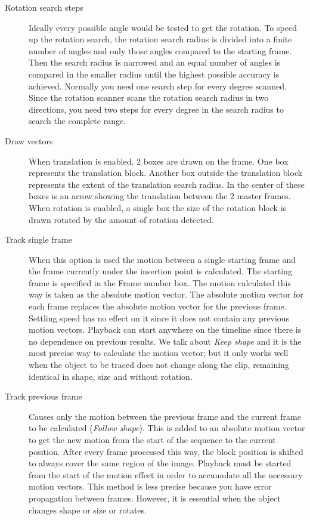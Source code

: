 \begin{description}
    \item[Rotation search steps] Ideally every possible angle would be tested to get the rotation. To speed up the rotation search, the rotation search radius is divided into a finite number of angles and only those angles compared to the starting frame. Then the search radius is narrowed and an equal number of angles is compared in the smaller radius until the highest possible accuracy is achieved. Normally you need one search step for every degree scanned. Since the rotation scanner scans the rotation search radius in two directions, you need two steps for every degree in the search radius to search the complete range.
    \item[Draw vectors] When translation is enabled, $2$ boxes are drawn on the frame. One box represents the translation block. Another box outside the translation block represents the extent of the translation search radius. In the center of these boxes is an arrow showing the translation between the $2$ master frames. When rotation is enabled, a single box the size of the rotation block is drawn rotated by the amount of rotation detected.
    \item[Track single frame] When this option is used the motion between a single starting frame and the frame currently under the insertion point is calculated. The starting frame is specified in the Frame number box. The motion calculated this way is taken as the absolute motion vector. The absolute motion vector for each frame replaces the absolute motion vector for the previous frame. Settling speed has no effect on it since it does not contain any previous motion vectors. Playback can start anywhere on the timeline since there is no dependence on previous results. We talk about \textit{Keep shape} and it is the most precise way to calculate the motion vector; but it only works well when the object to be traced does not change along the clip, remaining identical in shape, size and without rotation.
    \item[Track previous frame] Causes only the motion between the previous frame and the current frame to be calculated (\textit{Follow shape}). This is added to an absolute motion vector to get the new motion from the start of the sequence to the current position. After every frame processed this way, the block position is shifted to always cover the same region of the image. Playback must be started from the start of the motion effect in order to accumulate all the necessary motion vectors. This method is less precise because you have error propagation between frames. However, it is essential when the object changes shape or size or rotates.

\end{description}
